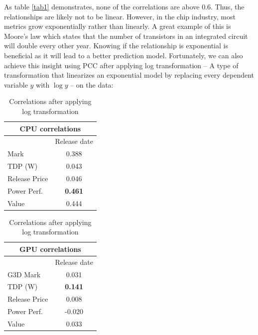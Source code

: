 \documentclass[conference]{IEEEtran}
\begin{document}
As table \ref{tab1} demonstrates, none of the correlations are above $0.6$.
Thus, the relationships are likely not to be linear. However, in the chip
industry, most metrics grow exponentially rather than linearly. A great example
of this is Moore's law which states that the number of transistors in an
integrated circuit will double every other year. Knowing if the relationship is
exponential is beneficial as it will lead to a better prediction model.
Fortunately, we can also achieve this insight using PCC after applying
log transformation -- A type of transformation that linearizes an
exponential model by replacing every dependent variable $y$ with $\log{y}$
-- on the data:

\begin{table}[htbp]
	\caption{Correlations after applying log transformation}
	\begin{center}
		\begin{tabular}[t]{|l|c|}
			\hline
			\multicolumn{2}{|c|}{\textbf{CPU correlations}} \\
			\hline
			              & Release date                    \\
			\hline
			Mark          & 0.388                           \\
			\hline
			TDP (W)       & 0.043                           \\
			\hline
			Release Price & 0.046                           \\
			\hline
			Power Perf.   & \textbf{0.461}                  \\
			\hline
			Value         & 0.444                           \\
			\hline
		\end{tabular}
		\quad
		\begin{tabular}[t]{|l|c|}
			\hline
			\multicolumn{2}{|c|}{\textbf{GPU correlations}} \\
			\hline
			              & Release date                    \\
			\hline
			G3D Mark      & 0.031                           \\
			\hline
			TDP (W)       & \textbf{0.141}                  \\
			\hline
			Release Price & 0.008                           \\
			\hline
			Power Perf.   & -0.020                          \\
			\hline
			Value         & 0.033                           \\
			\hline
		\end{tabular}
	\end{center}
	\label{tab2}
\end{table}
\end{document}
